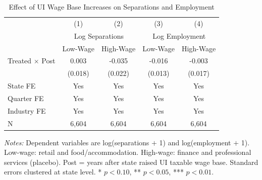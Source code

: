 \begin{table}[H]
\centering
\caption{Effect of UI Wage Base Increases on Separations and Employment}
\label{tab:main}
\begin{threeparttable}
\begin{tabular}{lcccc}
\toprule
 & (1) & (2) & (3) & (4) \\
 & \multicolumn{2}{c}{Log Separations} & \multicolumn{2}{c}{Log Employment} \\
 & Low-Wage & High-Wage & Low-Wage & High-Wage \\
\midrule
Treated $\times$ Post & 0.003 & -0.035 & -0.016 & -0.003 \\
 & (0.018) & (0.022) & (0.013) & (0.017) \\
\midrule
State FE & Yes & Yes & Yes & Yes \\
Quarter FE & Yes & Yes & Yes & Yes \\
Industry FE & Yes & Yes & Yes & Yes \\
N & 6,604 & 6,604 & 6,604 & 6,604 \\
\bottomrule
\end{tabular}
\begin{tablenotes}[flushleft]
\small
\item \textit{Notes:} Dependent variables are log(separations $+$ 1) and log(employment $+$ 1). Low-wage: retail and food/accommodation. High-wage: finance and professional services (placebo). Post = years after state raised UI taxable wage base. Standard errors clustered at state level. * $p<0.10$, ** $p<0.05$, *** $p<0.01$.
\end{tablenotes}
\end{threeparttable}
\end{table}

